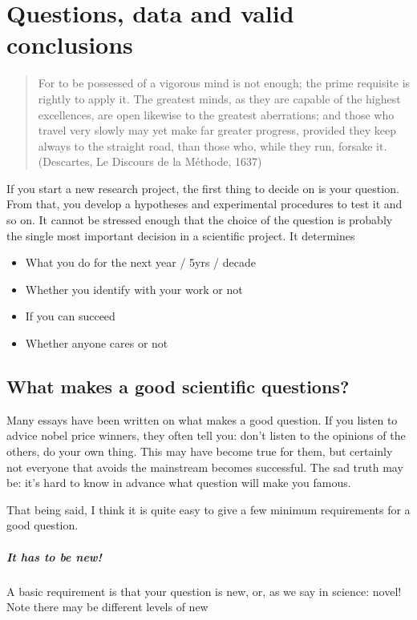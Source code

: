 \documentclass{tufte-book}
\begin{document}
\chapter{Questions, data and valid conclusions}

\begin{quote}
For to be possessed of a vigorous mind is not enough; the prime requisite is rightly to apply it. The greatest minds, as they are capable of the highest excellences, are open likewise to the greatest aberrations; and those who travel very slowly may yet make far greater progress, provided they keep always to the straight road, than those who, while they run, forsake it. (Descartes, Le Discours de la Méthode, 1637) 
\end{quote}


If you start a new research project, the first thing to decide on is your question. From that, you develop a hypotheses and experimental procedures to test it and so on. It cannot be stressed enough that the choice of the question is probably the single most important decision in a scientific project. It determines 

\begin{itemize}
\item What you do for the next year / 5yrs / decade
\item Whether you identify with your work or not
\item If you can succeed
\item Whether anyone cares or not
\end{itemize}


\section{What makes a good scientific questions?}

Many essays have been written on what makes a good question. If you listen to advice nobel price winners, they often tell you: don't listen to the opinions of the others, do your own thing. This may have become true for them, but certainly not everyone that avoids the mainstream becomes successful. The sad truth may be: it's hard to know in advance what question will make you famous.

That being said, I think it is quite easy to give a few minimum requirements for a good question. 


\paragraph{It has to be new!} A basic requirement is that your question is new, or, as we say in science: novel! Note there may be different levels of new
\end{document}
